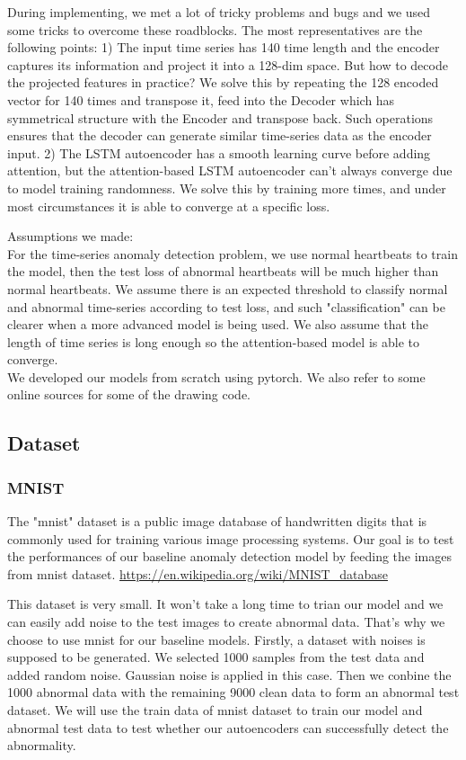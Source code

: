 \documentclass{article}
\begin{document}
During implementing, we met a lot of tricky problems and bugs and we used some tricks to overcome these roadblocks. The most representatives are the following points: 1) The input time series has 140 time length and the encoder captures its information and project it into a 128-dim space. But how to decode the projected features in practice? We solve this by repeating the 128 encoded vector for 140 times and transpose it, feed into the Decoder which has symmetrical structure with the Encoder and transpose back. Such operations ensures that the decoder can generate similar time-series data as the encoder input. 2) The LSTM autoencoder has a smooth learning curve before adding attention, but the attention-based LSTM autoencoder can't always converge  due to model training randomness. We solve this by training more times, and under most circumstances it is able to converge at a specific loss.

Assumptions we made: \\
For the time-series anomaly detection problem, we use normal heartbeats to train the model, then the test loss of abnormal heartbeats will be much higher than normal heartbeats. We assume there is an expected threshold to classify normal and abnormal time-series according to test loss, and such "classification" can be clearer when a more advanced model is being used. We also assume that the length of time series is long enough so the attention-based model is able to converge.\\

We developed our models from scratch using pytorch. We also refer to some online sources for some of the drawing code.

\subsection{Dataset}
\subsubsection{MNIST}
The "mnist" dataset is a public image database of handwritten digits that is commonly used for training various image processing systems. Our goal is to test the performances of our baseline anomaly detection model by feeding the images from mnist dataset.
\url{https://en.wikipedia.org/wiki/MNIST_database}

This dataset is very small. It won't take a long time to trian our model and we can easily add noise to the test images to create abnormal data. That's why we choose to use mnist for our baseline models. Firstly, a dataset with noises is supposed to be generated. We selected 1000 samples from the test data and added random noise. Gaussian noise is applied in this case. Then we conbine the 1000 abnormal data with the remaining 9000 clean data to form an abnormal test dataset. We will use the
train data of mnist dataset to train our model and abnormal test data to test whether our autoencoders can successfully detect the abnormality.
\end{document}
